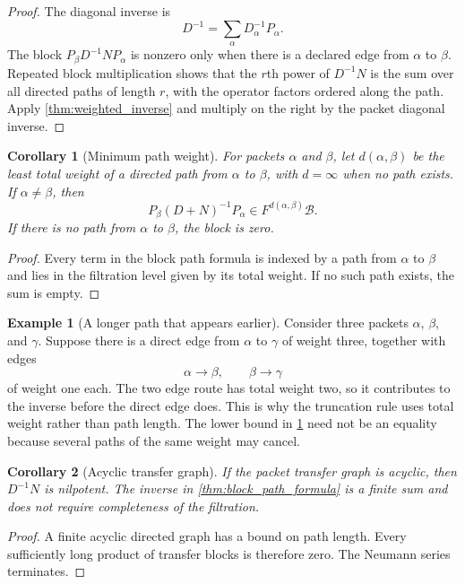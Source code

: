 \documentclass{aomart}
\newtheorem{corollary}[corollary]{Corollary}
\theoremstyle{definition}
\newtheorem{example}[example]{Example}
\theoremstyle{remark}
\newcommand{\Bcal}{\mathcal B}
\begin{document}
\begin{proof}
The diagonal inverse is
\[
D^{-1}=\sum_\alpha D_\alpha^{-1}P_\alpha.
\]
The block $P_\beta D^{-1}NP_\alpha$ is nonzero only when there is a declared edge from $\alpha$ to $\beta$.  Repeated block multiplication shows that the $r$th power of $D^{-1}N$ is the sum over all directed paths of length $r$, with the operator factors ordered along the path.  Apply \cref{thm:weighted_inverse} and multiply on the right by the packet diagonal inverse.
\end{proof}

\begin{corollary}[Minimum path weight]\label{cor:minimum_path_weight}
For packets $\alpha$ and $\beta$, let $d(\alpha,\beta)$ be the least total weight of a directed path from $\alpha$ to $\beta$, with $d=\infty$ when no path exists.  If $\alpha\ne\beta$, then
\[
P_\beta(D+N)^{-1}P_\alpha
\in
F^{d(\alpha,\beta)}\Bcal.
\]
If there is no path from $\alpha$ to $\beta$, the block is zero.
\end{corollary}

\begin{proof}
Every term in the block path formula is indexed by a path from $\alpha$ to $\beta$ and lies in the filtration level given by its total weight.  If no such path exists, the sum is empty.
\end{proof}

\begin{example}[A longer path that appears earlier]\label{ex:weighted_route}
Consider three packets $\alpha$, $\beta$, and $\gamma$.  Suppose there is a direct edge from $\alpha$ to $\gamma$ of weight three, together with edges
\[
\alpha\longrightarrow\beta,
\qquad
\beta\longrightarrow\gamma
\]
of weight one each.  The two edge route has total weight two, so it contributes to the inverse before the direct edge does.  This is why the truncation rule uses total weight rather than path length.  The lower bound in \cref{cor:minimum_path_weight} need not be an equality because several paths of the same weight may cancel.
\end{example}

\begin{corollary}[Acyclic transfer graph]\label{cor:acyclic_inverse}
If the packet transfer graph is acyclic, then $D^{-1}N$ is nilpotent.  The inverse in \cref{thm:block_path_formula} is a finite sum and does not require completeness of the filtration.
\end{corollary}

\begin{proof}
A finite acyclic directed graph has a bound on path length.  Every sufficiently long product of transfer blocks is therefore zero.  The Neumann series terminates.
\end{proof}
\end{document}

